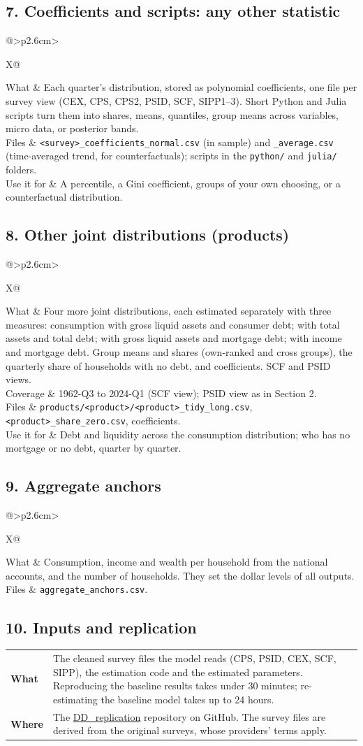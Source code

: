 \documentclass[11pt]{article}
\makeatletter
\newcommand{\file}[1]{\texttt{#1}}
\newenvironment{product}[1]{\subsection*{#1}}{}
\newcommand{\facts}[1]{\begin{tabularx}{\linewidth}{@{}>{\bfseries}p{2.6cm}>{\raggedright\arraybackslash}X@{}}#1\end{tabularx}\par\vspace{3pt}}
\makeatother
\begin{document}
\begin{product}{7. Coefficients and scripts: any other statistic}
\facts{
What & Each quarter's distribution, stored as polynomial coefficients, one file per survey view (CEX, CPS,
       CPS2, PSID, SCF, SIPP1--3). Short Python and Julia scripts turn them into shares, means,
       quantiles, group means across variables, micro data, or posterior bands. \\
Files & \file{<survey>\_coefficients\_normal.csv} (in sample) and \file{\_average.csv} (time-averaged
        trend, for counterfactuals); scripts in the \file{python/} and \file{julia/} folders. \\
Use it for & A percentile, a Gini coefficient, groups of your own choosing, or a counterfactual
             distribution. \\
}
\end{product}

\begin{product}{8. Other joint distributions (products)}
\facts{
What & Four more joint distributions, each estimated separately with three measures: consumption with
       gross liquid assets and consumer debt; with total assets and total debt; with gross liquid assets and
       mortgage debt; with income and mortgage debt. Group means and shares (own-ranked and cross groups),
       the quarterly share of households with no debt, and coefficients. SCF and PSID views. \\
Coverage & 1962-Q3 to 2024-Q1 (SCF view); PSID view as in Section 2. \\
Files & \file{products/<product>/<product>\_tidy\_long.csv}, \file{<product>\_share\_zero.csv}, coefficients. \\
Use it for & Debt and liquidity across the consumption distribution; who has no mortgage or no debt, quarter by quarter. \\
}
\end{product}

\begin{product}{9. Aggregate anchors}
\facts{
What & Consumption, income and wealth per household from the national accounts, and the number of
       households. They set the dollar levels of all outputs. \\
Files & \file{aggregate\_anchors.csv}. \\
}
\end{product}

\begin{product}{10. Inputs and replication}
\facts{
What & The cleaned survey files the model reads (CPS, PSID, CEX, SCF, SIPP), the estimation code and the
       estimated parameters. Reproducing the baseline results takes under 30 minutes; re-estimating the
       baseline model takes up to 24 hours. \\
Where & The \href{https://github.com/LuisCald/DD_replication}{DD\_replication} repository on GitHub.
        The survey files are derived from the original surveys, whose providers' terms apply. \\
}
\end{product}
\end{document}
